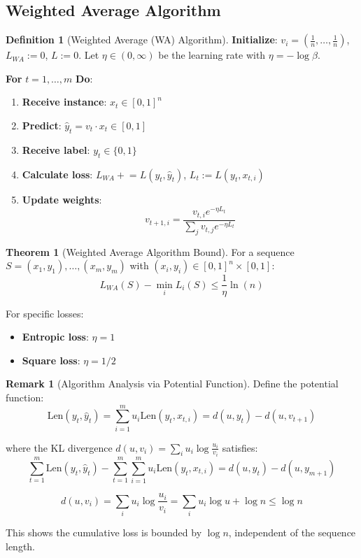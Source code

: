 \documentclass[12pt,a4paper]{article}
\theoremstyle{definition}
\newtheorem{definition}{Definition}[section]
\newtheorem{theorem}{Theorem}[section]
\newtheorem{remark}{Remark}[section]
\begin{document}
\subsection{Weighted Average Algorithm}

\begin{definition}[Weighted Average (WA) Algorithm]
\textbf{Initialize}: $v_i = \left(\frac{1}{n}, \ldots, \frac{1}{n}\right)$, $L_{WA} := 0$, $L := 0$. Let $\eta \in (0, \infty)$ be the learning rate with $\eta = -\log \beta$.

\textbf{For } $t = 1, \ldots, m$ \textbf{ Do}:
\begin{enumerate}
    \item \textbf{Receive instance}: $x_t \in [0,1]^n$
    \item \textbf{Predict}: $\hat{y}_t = v_t \cdot x_t \in [0,1]$
    \item \textbf{Receive label}: $y_t \in \{0, 1\}$
    \item \textbf{Calculate loss}: $L_{WA} \mathrel{+}= L(y_t, \hat{y}_t)$, $L_t := L(y_t, x_{t,i})$
    \item \textbf{Update weights}:
    \[
    v_{t+1,i} = \frac{v_{t,i} e^{-\eta L_t}}{\sum_j v_{t,j} e^{-\eta L_t}}
    \]
\end{enumerate}
\end{definition}

\begin{theorem}[Weighted Average Algorithm Bound]
For a sequence $S = (x_1, y_1), \ldots, (x_m, y_m)$ with $(x_i, y_i) \in [0,1]^n \times [0,1]$:
\[
L_{WA}(S) - \min_i L_i(S) \leq \frac{1}{\eta} \ln(n)
\]

For specific losses:
\begin{itemize}
    \item \textbf{Entropic loss}: $\eta = 1$
    \item \textbf{Square loss}: $\eta = 1/2$
\end{itemize}
\end{theorem}

\begin{remark}[Algorithm Analysis via Potential Function]
Define the potential function:
\[
\text{Len}(y_t, \hat{y}_t) = \sum_{i=1}^m u_i \text{Len}(y_t, x_{t,i}) = d(u, y_t) - d(u, v_{t+1})
\]

where the KL divergence $d(u, v_i) = \sum_i u_i \log \frac{u_i}{v_i}$ satisfies:
\[
\sum_{t=1}^m \text{Len}(y_t, \hat{y}_t) - \sum_{t=1}^m \sum_{i=1}^m u_i \text{Len}(y_t, x_{t,i}) = d(u, y_t) - d(u, y_{m+1})
\]

\[
d(u, v_i) = \sum_i u_i \log \frac{u_i}{v_i} = \sum_i u_i \log u + \log n \leq \log n
\]

This shows the cumulative loss is bounded by $\log n$, independent of the sequence length.
\end{remark}
\end{document}
